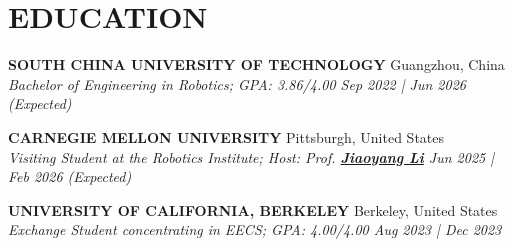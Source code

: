 \documentclass[a4paper,9pt]{extarticle}
\begin{document}
\section*{{\textbf{\fontsize{14pt}{8pt}\selectfont E}\textbf{\scshape DUCATION}}}
\textbf{SOUTH CHINA UNIVERSITY OF TECHNOLOGY} \hfill Guangzhou, China\\ %
\textit{Bachelor of Engineering in Robotics; GPA: 3.86/4.00  \hfill Sep 2022 | Jun 2026 (Expected)} %
\par\vspace{4pt}\noindent
\textbf{CARNEGIE MELLON UNIVERSITY} \hfill Pittsburgh, United States \\ %
\textit{Visiting Student at the Robotics Institute; Host: Prof. {\href{https://jiaoyangli.me/}{\textbf{Jiaoyang Li}}}  \hfill Jun 2025 | Feb 2026 (Expected)}  %
\par\vspace{4pt}\noindent
\textbf{UNIVERSITY OF CALIFORNIA, BERKELEY} \hfill Berkeley, United States\\ %
\textit{Exchange Student concentrating in EECS; GPA: 4.00/4.00 \hfill   Aug 2023 | Dec 2023} %




\end{document}

